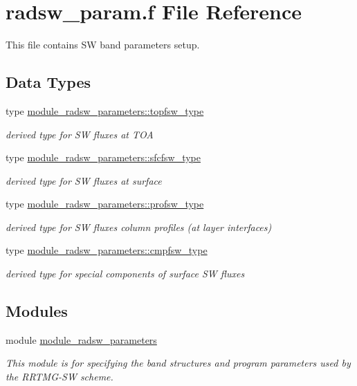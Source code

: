 \hypertarget{radsw__param_8f}{}\section{radsw\+\_\+param.\+f File Reference}
\label{radsw__param_8f}


This file contains SW band parameters setup.  


\subsection*{Data Types}
\begin{DoxyCompactItemize}
\item 
type \hyperlink{structmodule__radsw__parameters_1_1topfsw__type}{module\+\_\+radsw\+\_\+parameters\+::topfsw\+\_\+type}
\begin{DoxyCompactList}\small\item\em derived type for SW fluxes at T\+OA \end{DoxyCompactList}\item 
type \hyperlink{structmodule__radsw__parameters_1_1sfcfsw__type}{module\+\_\+radsw\+\_\+parameters\+::sfcfsw\+\_\+type}
\begin{DoxyCompactList}\small\item\em derived type for SW fluxes at surface \end{DoxyCompactList}\item 
type \hyperlink{structmodule__radsw__parameters_1_1profsw__type}{module\+\_\+radsw\+\_\+parameters\+::profsw\+\_\+type}
\begin{DoxyCompactList}\small\item\em derived type for SW fluxes\textquotesingle{} column profiles (at layer interfaces) \end{DoxyCompactList}\item 
type \hyperlink{structmodule__radsw__parameters_1_1cmpfsw__type}{module\+\_\+radsw\+\_\+parameters\+::cmpfsw\+\_\+type}
\begin{DoxyCompactList}\small\item\em derived type for special components of surface SW fluxes \end{DoxyCompactList}\end{DoxyCompactItemize}
\subsection*{Modules}
\begin{DoxyCompactItemize}
\item 
module \hyperlink{namespacemodule__radsw__parameters}{module\+\_\+radsw\+\_\+parameters}
\begin{DoxyCompactList}\small\item\em This module is for specifying the band structures and program parameters used by the R\+R\+T\+M\+G-\/\+SW scheme. \end{DoxyCompactList}\end{DoxyCompactItemize}
